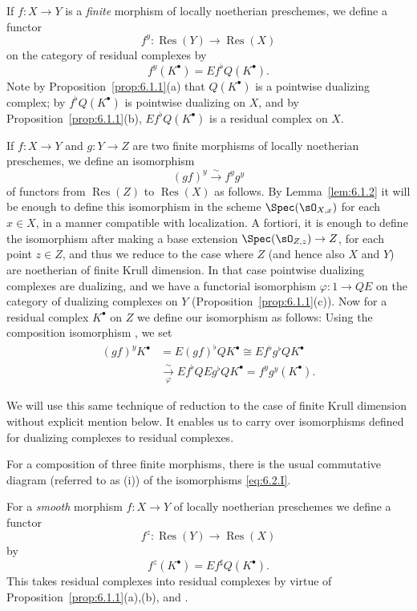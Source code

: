 If $f\colon X\to Y$ is a \emph{finite} morphism of locally noetherian preschemes, we define a functor
\[
f^{y}\colon \operatorname{Res}(Y)\longrightarrow \operatorname{Res}(X)
\]
on the category of residual complexes by
\[
f^{y}(K^{\bullet}) = Ef^{\flat} Q(K^{\bullet}).
\]
Note by Proposition~\ref{prop:6.1.1}(a) that $Q(K^\bullet)$ is a pointwise dualizing complex; by  $f^{\flat}Q(K^\bullet)$ is pointwise dualizing on $X$, and by Proposition~\ref{prop:6.1.1}(b), $Ef^{\flat}Q(K^\bullet)$ is a residual complex on $X$.

If $f\colon X\to Y$ and $g\colon Y\to Z$ are two finite morphisms of locally noetherian preschemes, we define an isomorphism
\[
(gf)^{y} \xrightarrow{\sim} f^{y}g^{y} \tag{I}\label{eq:6.2.I}
\]
of functors from $\operatorname{Res}(Z)$ to $\operatorname{Res}(X)$ as follows. By Lemma~\ref{lem:6.1.2} it will be enough to define this isomorphism in the scheme $\Spec(\sO_{X,x})$ for each $x\in X$, in a manner compatible with localization. A fortiori, it is enough to define the isomorphism after making a base extension $\Spec(\sO_{Z,z})\to Z$, for each point $z\in Z$, and thus we reduce to the case where $Z$ (and hence also $X$ and $Y$) are noetherian of finite Krull dimension. In that case pointwise dualizing complexes are dualizing, and we have a functorial isomorphism $\varphi\colon 1\to QE$ on the category of dualizing complexes on $Y$ (Proposition~\ref{prop:6.1.1}(c)). Now for a residual complex $K^\bullet$ on $Z$ we define our isomorphism as follows:
Using the composition isomorphism , we set
\[
\begin{aligned}
(gf)^yK^\bullet
 &= E(gf)^\flat QK^\bullet
  \cong Ef^\flat g^\flat QK^\bullet \\
 &\xrightarrow[\varphi]{\sim} Ef^\flat QE g^\flat QK^\bullet
  = f^y g^y(K^\bullet).
\end{aligned}
\]

We will use this same technique of reduction to the case of finite Krull dimension without explicit mention below. It enables us to carry over isomorphisms defined for dualizing complexes to residual complexes.

\label{compat:6.2.i}
For a composition of three finite morphisms, there is the usual commutative diagram (referred to as (i)) of the isomorphisms \eqref{eq:6.2.I}.

For a \emph{smooth} morphism $f\colon X\to Y$ of locally noetherian preschemes we define a functor
\[
f^{z}\colon \operatorname{Res}(Y)\longrightarrow \operatorname{Res}(X)
\]
by
\[
f^{z}(K^\bullet) = Ef^{\sharp}Q(K^\bullet).
\]
This takes residual complexes into residual complexes by virtue of Proposition~\ref{prop:6.1.1}(a),(b), and .

